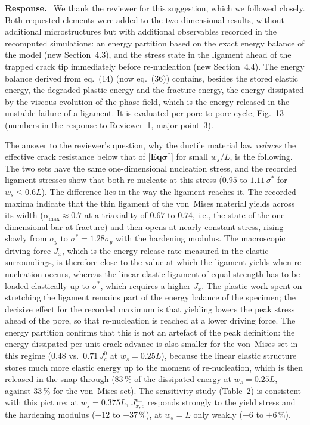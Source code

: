 \documentclass[pdflatex,sn-mathphys-num]{sn-jnl}
\newcommand{\EqSigmaStarLabel}{[\textbf{Eq$\boldsymbol{\sigma^*}$}]\xspace}
\newenvironment{response}
  {\par\noindent\textbf{Response.}\ }
  {\par}
\begin{document}
\begin{response}
We thank the reviewer for this suggestion, which we followed closely. Both requested elements were added to the two-dimensional results, without additional microstructures but with additional observables recorded in the recomputed simulations: an energy partition based on the exact energy balance of the model (new Section~4.3), and the stress state in the ligament ahead of the trapped crack tip immediately before re-nucleation (new Section~4.4). The energy balance derived from eq.~(14) (now eq.~(36)) contains, besides the stored elastic energy, the degraded plastic energy and the fracture energy, the energy dissipated by the viscous evolution of the phase field, which is the energy released in the unstable failure of a ligament. It is evaluated per pore-to-pore cycle, Fig.~13 (numbers in the response to Reviewer~1, major point~3).

The answer to the reviewer's question, why the ductile material law \emph{reduces} the effective crack resistance below that of \EqSigmaStarLabel for small $w_s/L$, is the following. The two sets have the same one-dimensional nucleation stress, and the recorded ligament stresses show that both re-nucleate at this stress ($0.95$ to $1.11\,\sigma^*$ for $w_s \le 0.6L$). The difference lies in the way the ligament reaches it. The recorded maxima indicate that the thin ligament of the von~Mises material yields across its width ($\alpha_{\max} \approx 0.7$ at a triaxiality of $0.67$ to $0.74$, i.e., the state of the one-dimensional bar at fracture) and then opens at nearly constant stress, rising slowly from $\sigma_y$ to $\sigma^* = 1.28\sigma_y$ with the hardening modulus. The macroscopic driving force $J_x$, which is the energy release rate measured in the elastic surroundings, is therefore close to the value at which the ligament yields when re-nucleation occurs, whereas the linear elastic ligament of equal strength has to be loaded elastically up to $\sigma^*$, which requires a higher $J_x$. The plastic work spent on stretching the ligament remains part of the energy balance of the specimen; the decisive effect for the recorded maximum is that yielding lowers the peak stress ahead of the pore, so that re-nucleation is reached at a lower driving force. The energy partition confirms that this is not an artefact of the peak definition: the energy dissipated per unit crack advance is also smaller for the von~Mises set in this regime ($0.48$ vs.\ $0.71\,J_c^0$ at $w_s = 0.25L$), because the linear elastic structure stores much more elastic energy up to the moment of re-nucleation, which is then released in the snap-through ($83\,\%$ of the dissipated energy at $w_s = 0.25L$, against $33\,\%$ for the von~Mises set). The sensitivity study (Table~2) is consistent with this picture: at $w_s = 0.375L$, $J_{x,c}^{\text{eff}}$ responds strongly to the yield stress and the hardening modulus ($-12$ to $+37\,\%$), at $w_s = L$ only weakly ($-6$ to $+6\,\%$).


\end{response}
\end{document}
